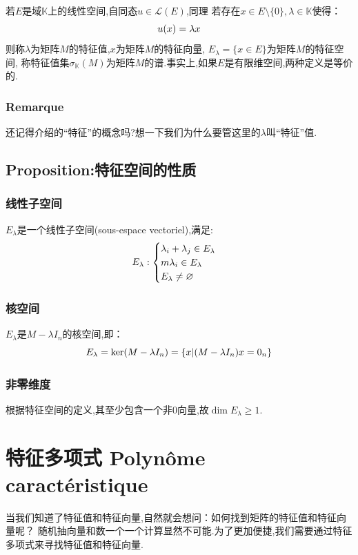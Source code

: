 \documentclass[12pt, a4paper, oneside]{ctexbook}
\begin{document}
  若$E$是域$\mathbb{K}$上的线性空间,自同态$u\in \mathcal{L} (E)$,同理
  若存在$x\in E\setminus\{0\}, \lambda\in\mathbb{K}$使得：
  \begin{equation}
    \notag
    u(x)=\lambda x
  \end{equation}
  则称$\lambda$为矩阵$M$的特征值,$x$为矩阵$M$的特征向量,
  $E_\lambda=\{x\in E\}$为矩阵$M$的特征空间,
  称特征值集$\sigma_{\mathbb{K}}(M)$为矩阵$M$的谱.事实上,如果$E$是有限维空间,两种定义是等价的.
  \subsubsection{Remarque}
  还记得介绍的“特征”的概念吗?想一下我们为什么要管这里的$\lambda$叫“特征”值.
  \subsection{Proposition:特征空间的性质}
  \subsubsection{线性子空间}
  $E_\lambda$是一个线性子空间(sous-espace vectoriel),满足:
  \begin{equation}
    \notag
    E_\lambda:
    \begin{cases}
    \lambda_i+\lambda_j\in E_\lambda \\
    m\lambda_i\in E_\lambda \\
    E_\lambda\neq \varnothing 
    \end{cases}
  \end{equation}
  \subsubsection{核空间}
  $E_\lambda$是$M-\lambda I_n$的核空间,即：
  \begin{equation}
    \notag
    E_\lambda=\ker(M-\lambda I_n)=\{x|(M-\lambda I_n)x=0_n\}
  \end{equation}
  \subsubsection{非零维度}
  根据特征空间的定义,其至少包含一个非0向量,故$\dim E_\lambda \ge 1$.


\section{特征多项式 Polynôme caractéristique}
  当我们知道了特征值和特征向量,自然就会想问：如何找到矩阵的特征值和特征向量呢？
  随机抽向量和数一个一个计算显然不可能.为了更加便捷,我们需要通过特征多项式来寻找特征值和特征向量.
\end{document}
